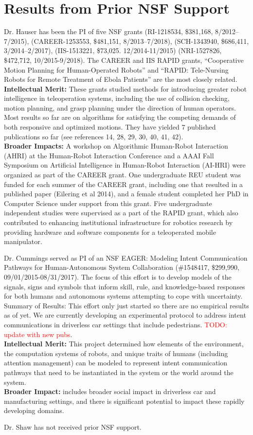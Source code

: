 \section*{Results from Prior NSF Support}

Dr. Hauser has been the PI of five NSF grants (RI-1218534, \$381,168, 8/2012–7/2015), (CAREER-1253553, \$481,151, 8/2013–7/2018), (SCH-1343940, \$686,411, 3/2014–2/2017), (IIS-1513221, \$73,025. 12/2014-11/2015) (NRI-1527826, \$472,712, 10/2015-9/2018). The CAREER and IIS RAPID grants, ``Cooperative Motion Planning for Human-Operated Robots'' and ``RAPID: Tele-Nursing Robots for Remote Treatment of Ebola Patients'' are the most closely related. \\
{\bf Intellectual Merit:} These grants studied methods for introducing greater robot intelligence in teleoperation systems, including the use of collision checking, motion planning, and grasp planning under the direction of human operators. Most results so far are on algorithms for satisfying the competing demands of both responsive and optimized motions. They have yielded 7 published publications so far (see references 14, 28, 29, 30, 40, 41, 42). \\
{\bf Broader Impacts:} A workshop on Algorithmic Human-Robot Interaction (AHRI) at the Human-Robot Interaction Conference and a AAAI Fall Symposium on Artificial Intelligence in Human-Robot Interaction (AI-HRI) were organized as part of the CAREER grant. One undergraduate REU student was funded for each summer of the CAREER grant, including one that resulted in a published paper (Eilering et al 2014), and a female student completed her PhD in Computer Science under support from this grant.  Five undergraduate independent studies were supervised as a part of the RAPID grant, which also contributed to enhancing institutional infrastructure for robotics research by providing hardware and software components for a teleoperated mobile manipulator.


Dr. Cummings served as PI of an NSF EAGER: Modeling Intent Communication Pathways for Human-Autonomous System Collaboration (\#1548417, \$299,990, 09/01/2015-08/31/2017).  The focus of this effort is to develop models of the signals, signs and symbols that inform skill, rule, and knowledge-based responses for both humans and autonomous systems attempting to cope with uncertainty. 
Summary of Results: This effort only just started so there are no empirical results as of yet. We are currently developing an experimental protocol to address intent communications in driverless car settings that include pedestrians. \textcolor{red}{TODO: update with new pubs}.  \\
{\bf Intellectual Merit:} This project determined how elements of the environment, the computation systems of robots, and unique traits of humans (including attention management) can be modeled to represent intent communication pathways that need to be instantiated in the system or the world around the system.\\
{\bf Broader Impact:} includes broader social impact in driverless car and manufacturing settings, and  there is significant potential to impact these rapidly developing domains.

Dr. Shaw has not received prior NSF support.
